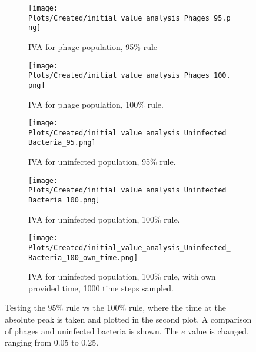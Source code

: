 \begin{figure}
    \centering
    \begin{subfigure}{1\linewidth}
        \centering
        \texttt{[image: Plots/Created/initial\_value\_analysis\_Phages\_95.png]}
        \caption{
            IVA for phage population, 95\% rule
        }
        \label{fig:appendixF:IVA_phage_95}
    \end{subfigure}
    \hfill
    \begin{subfigure}{1\linewidth}
        \centering
        \texttt{[image: Plots/Created/initial\_value\_analysis\_Phages\_100.png]}
        \caption{
            IVA for phage population, 100\% rule.  
        }
        \label{fig:appendixF:IVA_phages_100}
    \end{subfigure}
    \hfill
    \begin{subfigure}{1\linewidth}
        \centering
        \texttt{[image: Plots/Created/initial\_value\_analysis\_Uninfected\_Bacteria\_95.png]}
        \caption{
            IVA for uninfected population, 95\% rule. 
        }
        \label{fig:appendixF:IVA_uninfected_bacteria_95}
    \end{subfigure}
    \hfill 
    \begin{subfigure}{1\linewidth}
        \centering
        \texttt{[image: Plots/Created/initial\_value\_analysis\_Uninfected\_Bacteria\_100.png]}
        \caption{
            IVA for uninfected population, 100\% rule. 
        }
        \label{fig:appendixF:IVA_uninfected_bacteria_100}
    \end{subfigure}
    \begin{subfigure}{1\linewidth}
        \centering
        \texttt{[image: Plots/Created/initial\_value\_analysis\_Uninfected\_Bacteria\_100\_own\_time.png]}
        \caption{
            IVA for uninfected population, 100\% rule, with own provided time, 1000 time steps sampled. 
        }
        \label{fig:appendixF:IVA_uninfected_bacteria_100_own_time}
    \end{subfigure}
    \caption{
        Testing the 95\% rule vs the 100\% rule, where the time at the absolute peak is taken and plotted in the second plot. 
        A comparison of phages and uninfected bacteria is shown. 
        The $e$ value is changed, ranging from 0.05 to 0.25. 
    }
    \label{fig:appendixF:IVA_95_vs_100}

\end{figure}